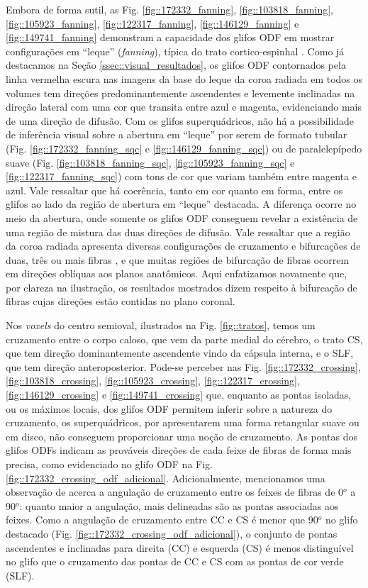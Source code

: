 Embora de forma sutil, as Fig.
\ref{fig::172332_fanning},
\ref{fig::103818_fanning},
\ref{fig::105923_fanning},
\ref{fig::122317_fanning},
\ref{fig::146129_fanning} e
\ref{fig::149741_fanning} demonstram a capacidade dos glifos ODF em mostrar configurações em ``leque'' (\textit{fanning}), típica do trato cortico-espinhal \cite{fortin2012, wang2019}. Como já destacamos na Seção \ref{ssec::visual_resultados}, os glifos ODF contornados pela linha vermelha escura nas imagens da base do leque da coroa radiada em todos os volumes tem  direções predominantemente ascendentes e levemente inclinadas na direção lateral com uma cor que transita entre azul e magenta, evidenciando mais de uma direção de difusão. Com os glifos superquádricos, não há a possibilidade de inferência visual sobre a abertura em ``leque'' por serem de formato tubular (Fig. \ref{fig::172332_fanning_sqc} e \ref{fig::146129_fanning_sqc}) ou de paralelepípedo suave (Fig. \ref{fig::103818_fanning_sqc}, \ref{fig::105923_fanning_sqc} e \ref{fig::122317_fanning_sqc}) com tons de cor que variam também entre magenta e azul. Vale ressaltar que há coerência, tanto em cor quanto em forma, entre os glifos ao lado da região de abertura em ``leque'' destacada. A diferença ocorre no meio da abertura, onde somente os glifos ODF conseguem revelar a existência de uma região de mistura das duas direções de difusão. Vale ressaltar que a região da coroa radiada apresenta diversas configurações de cruzamento e bifurcações de duas, três ou mais fibras \cite{schilling2017}, e que muitas regiões de bifurcação de fibras ocorrem em direções oblíquas aos planos anatômicos. Aqui enfatizamos novamente que, por clareza na ilustração, os resultados mostrados dizem respeito à bifurcação de fibras cujas direções estão contidas no plano coronal.

Nos \textit{voxels} do centro semioval, ilustrados na Fig. \ref{fig::tratos},  temos um cruzamento entre o corpo caloso, que vem da parte medial do cérebro,
o trato CS, que tem direção dominantemente ascendente vindo da cápsula interna, e o SLF, que tem direção anteroposterior. Pode-se perceber nas Fig.
\ref{fig::172332_crossing},
\ref{fig::103818_crossing},
\ref{fig::105923_crossing},
\ref{fig::122317_crossing},
\ref{fig::146129_crossing} e
\ref{fig::149741_crossing} que, 
enquanto as pontas isoladas, ou os máximos locais, dos glifos ODF permitem inferir sobre a natureza do cruzamento, os superquádricos, por apresentarem uma forma retangular suave ou em disco, não conseguem proporcionar uma noção de cruzamento. As pontas dos glifos ODFs indicam as prováveis direções de cada feixe de fibras de forma mais precisa, como evidenciado no glifo ODF na Fig. \ref{fig::172332_crossing_odf_adicional}. Adicionalmente, mencionamos uma observação de  acerca a angulação de cruzamento entre os feixes de fibras de 0$^o$ a 90$^o$: quanto maior a angulação, mais delineadas são as pontas associadas aos feixes. Como a angulação de cruzamento entre CC e CS é menor que 90$^o$ no glifo destacado (Fig. \ref{fig::172332_crossing_odf_adicional}), o conjunto de pontas ascendentes e inclinadas para direita (CC) e esquerda (CS) é menos distinguível no glifo que o cruzamento das pontas de CC e CS com as pontas de cor verde (SLF).

